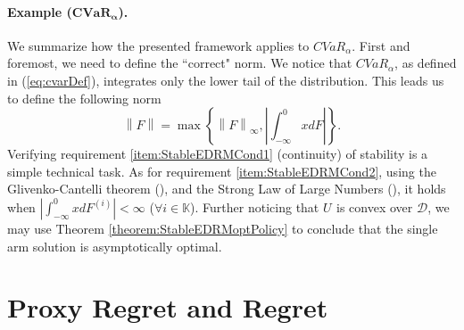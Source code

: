 \documentclass[final,12pt]{colt2018}
\newcommand{\prn}[1]{\left( #1 \right)}
\newcommand{\brc}[1]{\left\lbrace #1 \right\rbrace}
\newcommand{\abs}[1]{\left| #1 \right|}
\newcommand{\norm}[1]{\left\lVert #1 \right\rVert}
\newcommand{\CVAR}[1][\alpha]{CVaR_{#1}}
\newcommand{\RHat}[1][]{{U}^{#1}}
\newcommand{\Fi}[1][i]{F^{\prn{{#1}}}}
\newcommand{\DistSet}{\mathcal{D}}
\newcommand{\actionSet}{\mathds{K}}
\begin{document}
	
	
	\paragraph{Example ($\mathbf{\CVAR}$).} We summarize how the presented framework applies to $\CVAR$. First and foremost, we need to define the ``correct" norm. We notice that $\CVAR$, as defined in (\ref{eq:cvarDef}), integrates only the lower tail of the distribution. This leads us to define the following norm
	\begin{equation} \label{eq:inftyMuNormDef}
		\norm{F} = \max \brc{\norm{F}_\infty, \abs{\int_{-\infty}^0 x dF}}.
	\end{equation}
	Verifying requirement \ref{item:StableEDRMCond1} (continuity) of stability is a simple technical task. As for requirement \ref{item:StableEDRMCond2}, using the Glivenko-Cantelli theorem (\cite{van2000asymptotic}), and the Strong Law of Large Numbers (\cite{Simonnet1996}), it holds when $\abs{\int_{-\infty}^{0}x d\Fi} < \infty$ ($\forall i \in \actionSet$). Further noticing that $\RHat$ is convex over $\DistSet$, we may use Theorem \ref{theorem:StableEDRMoptPolicy} to conclude that the single arm solution is asymptotically optimal.
	
	
	
	
	
	
	
	
	
	
	
	
	
	
	
	
	
	
	
	
	
	
	
	
	
	
	
	
	
	
	
	
	
	
	
	
	
	
	
	
	
	
	
	
	
	
	
	
	
	
	
	
	
	
	
	\section{Proxy Regret and Regret}
	\label{sec:proxyRegret}
\end{document}
